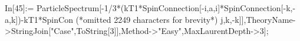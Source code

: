 In[45]:= ParticleSpectrum[-1/3*(kT1*SpinConnection[-i,a,i]*SpinConnection[-k,-a,k])-kT1*SpinCon (*omitted 2249 characters for brevity*) j,k,-k]],TheoryName->StringJoin["Case",ToString[3]],Method->"Easy",MaxLaurentDepth->3];
